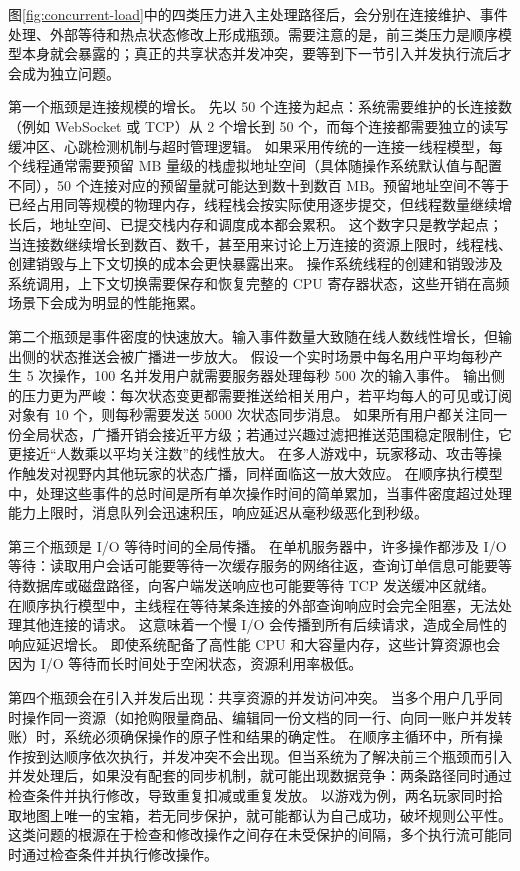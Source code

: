 图\ref{fig:concurrent-load}中的四类压力进入主处理路径后，会分别在连接维护、事件处理、外部等待和热点状态修改上形成瓶颈。需要注意的是，前三类压力是顺序模型本身就会暴露的；真正的共享状态并发冲突，要等到下一节引入并发执行流后才会成为独立问题。

第一个瓶颈是连接规模的增长。
先以 50 个连接为起点：系统需要维护的长连接数（例如 WebSocket 或 TCP）从 2 个增长到 50 个，而每个连接都需要独立的读写缓冲区、心跳检测机制与超时管理逻辑。
如果采用传统的一连接一线程模型，每个线程通常需要预留 MB 量级的栈虚拟地址空间（具体随操作系统默认值与配置不同），50 个连接对应的预留量就可能达到数十到数百 MB。预留地址空间不等于已经占用同等规模的物理内存，线程栈会按实际使用逐步提交，但线程数量继续增长后，地址空间、已提交栈内存和调度成本都会累积。
这个数字只是教学起点；当连接数继续增长到数百、数千，甚至用来讨论上万连接的资源上限时，线程栈、创建销毁与上下文切换的成本会更快暴露出来。
操作系统线程的创建和销毁涉及系统调用，上下文切换需要保存和恢复完整的 CPU 寄存器状态，这些开销在高频场景下会成为明显的性能拖累。

第二个瓶颈是事件密度的快速放大。输入事件数量大致随在线人数线性增长，但输出侧的状态推送会被广播进一步放大。
假设一个实时场景中每名用户平均每秒产生 5 次操作，100 名并发用户就需要服务器处理每秒 500 次的输入事件。
输出侧的压力更为严峻：每次状态变更都需要推送给相关用户，若平均每人的可见或订阅对象有 10 个，则每秒需要发送 5000 次状态同步消息。
如果所有用户都关注同一份全局状态，广播开销会接近平方级；若通过兴趣过滤把推送范围稳定限制住，它更接近“人数乘以平均关注数”的线性放大。
在多人游戏中，玩家移动、攻击等操作触发对视野内其他玩家的状态广播，同样面临这一放大效应。
在顺序执行模型中，处理这些事件的总时间是所有单次操作时间的简单累加，当事件密度超过处理能力上限时，消息队列会迅速积压，响应延迟从毫秒级恶化到秒级。

第三个瓶颈是 I/O 等待时间的全局传播。
在单机服务器中，许多操作都涉及 I/O 等待：读取用户会话可能要等待一次缓存服务的网络往返，查询订单信息可能要等待数据库或磁盘路径，向客户端发送响应也可能要等待 TCP 发送缓冲区就绪。
在顺序执行模型中，主线程在等待某条连接的外部查询响应时会完全阻塞，无法处理其他连接的请求。
这意味着一个慢 I/O 会传播到所有后续请求，造成全局性的响应延迟增长。
即使系统配备了高性能 CPU 和大容量内存，这些计算资源也会因为 I/O 等待而长时间处于空闲状态，资源利用率极低。

第四个瓶颈会在引入并发后出现：共享资源的并发访问冲突。
当多个用户几乎同时操作同一资源（如抢购限量商品、编辑同一份文档的同一行、向同一账户并发转账）时，系统必须确保操作的原子性和结果的确定性。
在顺序主循环中，所有操作按到达顺序依次执行，并发冲突不会出现。但当系统为了解决前三个瓶颈而引入并发处理后，如果没有配套的同步机制，就可能出现数据竞争：两条路径同时通过检查条件并执行修改，导致重复扣减或重复发放。
以游戏为例，两名玩家同时拾取地图上唯一的宝箱，若无同步保护，就可能都认为自己成功，破坏规则公平性。
这类问题的根源在于检查和修改操作之间存在未受保护的间隔，多个执行流可能同时通过检查条件并执行修改操作。

